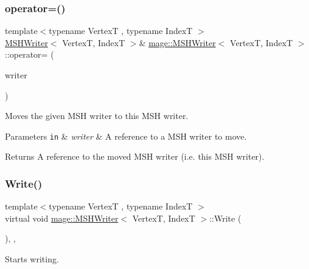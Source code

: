 \subsubsection{\texorpdfstring{operator=()}{operator=()}\hspace{0.1cm}{\footnotesize\ttfamily [2/2]}}
{\footnotesize\ttfamily template$<$typename VertexT , typename IndexT $>$ \\
\hyperlink{classmage_1_1_m_s_h_writer}{M\+S\+H\+Writer}$<$ VertexT, IndexT $>$\& \hyperlink{classmage_1_1_m_s_h_writer}{mage\+::\+M\+S\+H\+Writer}$<$ VertexT, IndexT $>$\+::operator= (\begin{DoxyParamCaption}\item[{\hyperlink{classmage_1_1_m_s_h_writer}{M\+S\+H\+Writer}$<$ VertexT, IndexT $>$ \&\&}]{writer }\end{DoxyParamCaption})\hspace{0.3cm}{\ttfamily [delete]}}

Moves the given M\+SH writer to this M\+SH writer.


\begin{DoxyParams}[1]{Parameters}
\mbox{\tt in}  & {\em writer} & A reference to a M\+SH writer to move. \\
\hline
\end{DoxyParams}
\begin{DoxyReturn}{Returns}
A reference to the moved M\+SH writer (i.\+e. this M\+SH writer). 
\end{DoxyReturn}
\hypertarget{classmage_1_1_m_s_h_writer_ab97c9570c45bff97d88700d0dcf3ed75}{}\label{classmage_1_1_m_s_h_writer_ab97c9570c45bff97d88700d0dcf3ed75} 
\subsubsection{\texorpdfstring{Write()}{Write()}}
{\footnotesize\ttfamily template$<$typename VertexT , typename IndexT $>$ \\
virtual void \hyperlink{classmage_1_1_m_s_h_writer}{mage\+::\+M\+S\+H\+Writer}$<$ VertexT, IndexT $>$\+::Write (\begin{DoxyParamCaption}{ }\end{DoxyParamCaption})\hspace{0.3cm}{\ttfamily [override]}, {\ttfamily [private]}, {\ttfamily [virtual]}}

Starts writing.


